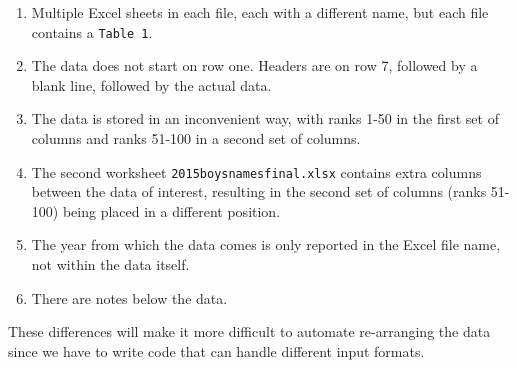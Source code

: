 \documentclass[
]{book}
\providecommand{\tightlist}{%
  \setlength{\itemsep}{0pt}\setlength{\parskip}{0pt}}
\begin{document}
\begin{alert}

\begin{enumerate}
\def\labelenumi{\arabic{enumi}.}
\tightlist
\item
  Multiple Excel sheets in each file, each with a different name, but each file contains a \texttt{Table\ 1}.
\item
  The data does not start on row one. Headers are on row 7, followed by a blank line, followed by the actual data.
\item
  The data is stored in an inconvenient way, with ranks 1-50 in the first set of columns and ranks 51-100 in a second set of columns.
\item
  The second worksheet \texttt{2015boysnamesfinal.xlsx} contains extra columns between the data of interest, resulting in the second set of columns (ranks 51-100) being placed in a different position.
\item
  The year from which the data comes is only reported in the Excel file name, not within the data itself.
\item
  There are notes below the data.
\end{enumerate}

These differences will make it more difficult to automate re-arranging the data since we have to write code that can handle different input formats.

\end{alert}
\end{document}
